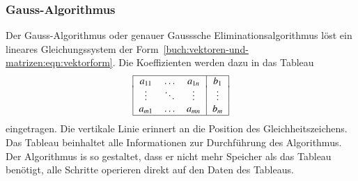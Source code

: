 \subsubsection{Gauss-Algorithmus}
Der Gauss-Algorithmus oder genauer Gausssche Eliminationsalgorithmus
löst ein lineares Gleichungssystem der
%
%
Form~\eqref{buch:vektoren-und-matrizen:eqn:vektorform}.
Die Koeffizienten werden dazu in das Tableau
\[
\begin{tabular}{|>{$}c<{$}>{$}c<{$}>{$}c<{$}|>{$}c<{$}|}
\hline
a_{11}&\dots &a_{1n}&b_1   \\[-2pt]
\vdots&\ddots&\vdots&\vdots\\
a_{m1}&\dots &a_{mn}&b_m   \\
\hline
\end{tabular}
\]
eingetragen.
Die vertikale Linie erinnert an die Position des Gleichheitszeichens.
Das Tableau beinhaltet alle Informationen zur Durchführung des Algorithmus.
Der Algorithmus is so gestaltet, dass er nicht mehr Speicher als
das Tableau benötigt, alle Schritte operieren direkt auf den Daten
des Tableaus.

